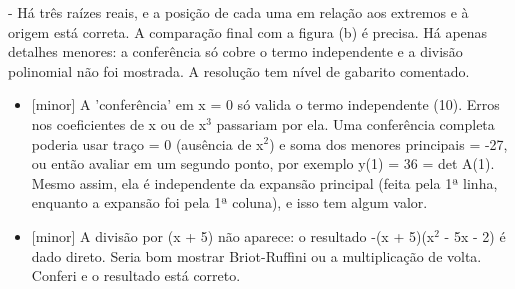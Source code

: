 \documentclass{article}%
\begin{document}
{-} Há três raízes reais, e a posição de cada uma em relação aos extremos e à origem está correta.\newline%
\newline%
A comparação final com a figura (b) é precisa. Há apenas detalhes menores: a conferência só cobre o termo independente e a divisão polinomial não foi mostrada. A resolução tem nível de gabarito comentado.%
\begin{itemize}%
\item%
{[}minor{]} A 'conferência' em x = 0 só valida o termo independente (10). Erros nos coeficientes de x ou de x$^3$ passariam por ela. Uma conferência completa poderia usar traço = 0 (ausência de x$^2$) e soma dos menores principais = -27, ou então avaliar em um segundo ponto, por exemplo y(1) = 36 = det A(1). Mesmo assim, ela é independente da expansão principal (feita pela 1ª linha, enquanto a expansão foi pela 1ª coluna), e isso tem algum valor.%
\item%
{[}minor{]} A divisão por (x + 5) não aparece: o resultado -(x + 5)(x$^2$ - 5x - 2) é dado direto. Seria bom mostrar Briot{-}Ruffini ou a multiplicação de volta. Conferi e o resultado está correto.%
\end{itemize}%
\end{document}

